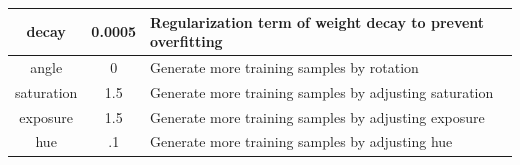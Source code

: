 \begin{table}[b]
{\begin{tabular}{@{}ccl@{}}
\multicolumn{1}{|c|}{decay}          & \multicolumn{1}{c|}{0.0005}                                                                          & \multicolumn{1}{l|}{Regularization term of weight decay  to prevent overfitting}                                                                                                                                                                                                                                                                                                                       \\ \midrule
\multicolumn{1}{|c|}{angle}          & \multicolumn{1}{c|}{0}                                                                               & \multicolumn{1}{l|}{Generate more training samples by rotation}                                                                                                                                                                                                                                                                                                                                        \\ \midrule
\multicolumn{1}{|c|}{saturation}     & \multicolumn{1}{c|}{1.5}                                                                             & \multicolumn{1}{l|}{Generate more training samples by adjusting saturation}                                                                                                                                                                                                                                                                                                                            \\ \midrule
\multicolumn{1}{|c|}{exposure}       & \multicolumn{1}{c|}{1.5}                                                                             & \multicolumn{1}{l|}{Generate more training samples by adjusting exposure}                                                                                                                                                                                                                                                                                                                              \\ \midrule
\multicolumn{1}{|c|}{hue}            & \multicolumn{1}{c|}{.1}                                                                              & \multicolumn{1}{l|}{Generate more training samples by adjusting hue}                                                                                                                                                                                                                                                                                                                                   \\ \midrule

\end{tabular}}
\end{table}
